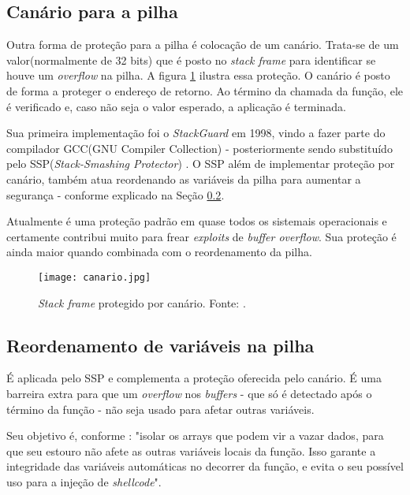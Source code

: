 		\subsection{Canário para a pilha}
			Outra forma de proteção para a pilha é colocação de um canário.
			Trata-se de um valor(normalmente de 32 bits) que é posto no \textsl{stack frame}
			para identificar se houve um \textsl{overflow} na pilha.
			A figura \ref{fig:canario} ilustra essa proteção. O canário é posto de forma
			a proteger o endereço de retorno. Ao término da chamada da função, ele é verificado
			e, caso não seja o valor esperado, a aplicação é terminada.


			Sua primeira implementação foi o  \textsl{StackGuard} em 1998, vindo a fazer
			parte do compilador GCC(GNU Compiler Collection) - posteriormente sendo
			substituído pelo SSP(\textsl{Stack-Smashing Protector}) \cite{Martins2009}.
			O SSP além de implementar proteção por canário, também atua reordenando
			as variáveis da pilha para aumentar a segurança - conforme explicado 
			na Seção \ref{subsec:reordenamento_pilha}.

			
			Atualmente é uma proteção padrão em quase todos os sistemais operacionais e certamente
			contribui muito para frear \textsl{exploits} de \textsl{buffer overflow}. Sua
			proteção é ainda maior quando combinada com o reordenamento da pilha.
			

			\begin{figure}
				\begin{center}
					\texttt{[image: canario.jpg]}
					\caption{\textsl{Stack frame} protegido por canário. Fonte: \cite{Furlan2005}.}
					\label{fig:canario}
				\end{center}
			\end{figure}

		\subsection{Reordenamento de variáveis na pilha}
		\label{subsec:reordenamento_pilha}
			É aplicada pelo SSP e complementa a proteção oferecida pelo canário.
			É uma barreira extra para que um \textsl{overflow} nos \textsl{buffers} - que só
			é detectado após o término da função - não seja usado para afetar outras variáveis.


			Seu objetivo é, conforme \cite{Martins2009}:
			"isolar os arrays que podem vir a vazar dados, para que seu estouro não
			afete as outras variáveis locais da função. Isso garante a integridade das variáveis
            automáticas no decorrer da função, e evita o seu possível uso para a injeção de \textsl{shellcode}".

